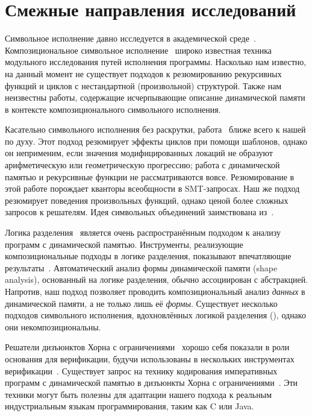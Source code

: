 \section{Смежные направления исследований}
\label{sec:related}

Символьное исполнение давно исследуется в академической среде~\cite{SurveySymExec-CSUR18}. Композициональное символьное исполнение~\cite{christakis2015ic,godefroid2007compositional,lin2016compositional} широко известная техника модульного исследования путей исполнения программы. Насколько нам известно, на данный момент не существует подходов к резюмированию рекурсивных функций и циклов с нестандартной (произвольной) структурой. Также нам неизвестны работы, содержащие исчерпывающие описание динамической памяти в контексте композиционального символьного исполнения. 

Касательно символьного исполнения без раскрутки, работа~\cite{slaby2013compact} ближе всего к нашей по духу. Этот подход резюмирует эффекты циклов при помощи шаблонов, однако он неприменим, если значения модифицированных локаций не образуют арифметическую или геометрическую прогрессию; работа с динамической памятью и рекурсивные функции не рассматриваются вовсе. Резюмирование в этой работе порождает кванторы всеобщности в SMT-запросах. Наш же подход резюмирует поведения произвольных функций, однако ценой более сложных запросов к решателям.
Идея символьных объединений заимствована из~\cite{torlak2014lightweight}.

Логика разделения~\cite{reynolds2002separation} является очень распространённым подходом к анализу программ с динамической памятью. Инструменты, реализующие композициональные подходы в логике разделения, показывают впечатляющие результаты~\cite{calcagno2011compositional,distefano2008jstar,calcagno2011infer}. Автоматический анализ формы динамической памяти (shape analysis), основанный на логике разделения, обычно ассоциирован с абстракцией. Напротив, наш подход позволяет проводить композициональный анализ \emph{данных} в динамической памяти, а не только лишь её \emph{формы}. Существует несколько подходов символьного исполнения, вдохновлённых логикой разделения (\cite{berdine2007shape,dudka2013byte,berdine2005symbolic}), однако они некомпозициональны.

Решатели дизъюнктов Хорна с ограничениями~\cite{grebenshchikov2012hsf,fedyukovich2017sampling,hoder2012generalized,hojjat2012verification,kafle2016solving,komuravelli2016smt,mcmillan2013computing,zhu2018data,albarghouthi2017probabilistic} хорошо себя показали в роли основания для верификации, будучи использованы в нескольких инструментах верификации~\cite{gurfinkel2015seahorn,kahsai2016jayhorn,hojjat2012verification}. Существует запрос на технику кодирования императивных программ с динамической памятью в дизъюнкты Хорна с ограничениями~\cite{gurfinkel2017context,kahsai2017quantified}. Эти техники могут быть полезны для адаптации нашего подхода к реальным индустриальным языкам программирования, таким как C или Java.

